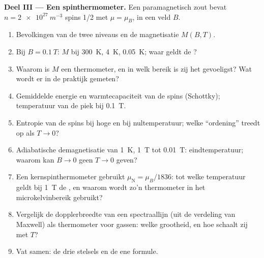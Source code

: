 \begin{problem}
\textbf{Deel III --- Een spinthermometer.}
Een paramagnetisch zout bevat $n = \qty{2e27}{m^{-3}}$ spins 1/2 met
$\mu
= \mu_B$, in een veld $B$.
\begin{enumerate}[resume]
  \item Bevolkingen van de twee niveaus en de magnetisatie
        $M(B,T)$.
  \item Bij $B = \qty{0.1}{T}$: $M$ bij \qty{300}{K}, \qty{4}{K}, \qty{0.05}{K};
        waar geldt de ?
  \item Waarom is $M$ een thermometer, en in welk bereik is zij het
        gevoeligst? Wat wordt er in de praktijk gemeten?
  \item Gemiddelde energie en warmtecapaciteit van de spins (Schottky);
        temperatuur van de piek bij \qty{0.1}{T}.
  \item Entropie van de spins bij hoge en bij nultemperatuur; welke
        ``ordening'' treedt op als $T \to 0$?
  \item Adiabatische demagnetisatie van \qty{1}{K}, \qty{1}{T} tot \qty{0.01}{T}:
        eindtemperatuur; waarom kan $B \to 0$ geen $T \to 0$ geven?
  \item Een kernspinthermometer gebruikt $\mu_{\text{N}} = \mu_B/1836$: tot
        welke temperatuur geldt bij \qty{1}{T} de , en
        waarom wordt zo'n thermometer in het microkelvinbereik gebruikt?
  \item Vergelijk de dopplerbreedte van een spectraallijn (uit de verdeling
        van Maxwell) als thermometer voor gassen: welke grootheid, en
        hoe schaalt zij met $T$?
  \item Vat samen: de drie stelsels en de ene formule.
\end{enumerate}
\end{problem}
